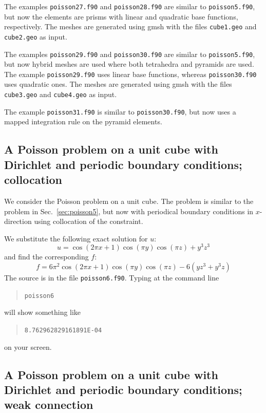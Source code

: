 The examples \texttt{poisson27.f90} and \texttt{poisson28.f90} are similar to \texttt{poisson5.f90}, but now the elements are prisms with linear and quadratic base functions, respectively. The meshes are generated using gmsh with the files \texttt{cube1.geo} and \texttt{cube2.geo} as input.

The examples \texttt{poisson29.f90} and \texttt{poisson30.f90} are similar to
\texttt{poisson5.f90}, but now hybrid meshes are used where both tetrahedra and
pyramids are used. The example  \texttt{poisson29.f90} uses linear base
functions, whereas  \texttt{poisson30.f90} uses quadratic ones. The meshes are generated using gmsh with the files \texttt{cube3.geo} and \texttt{cube4.geo} as input.

The example \texttt{poisson31.f90} is similar to \texttt{poisson30.f90}, but
now uses a mapped integration rule on the pyramid elements.

\subsection{A Poisson problem on a unit cube with Dirichlet
            and periodic boundary conditions; collocation}
\label{sec:poisson6}

We consider the Poisson problem on a unit cube. The problem is similar to
the problem in Sec.~\ref{sec:poisson5}, but now with periodical boundary
conditions in $x$-direction using collocation of the constraint.

We substitute the following exact solution for $u$:
\begin{equation}
     u=\cos(2\pi x+1)\cos(\pi y)\cos(\pi z) + y^3z^3
\end{equation}
and find the corresponding $f$:
\begin{equation}
     f=6\pi^2\cos(2\pi x+1)\cos(\pi y)\cos(\pi z) - 6(yz^3+y^3z)
\end{equation}
The source is in the file \texttt{poisson6.f90}.
Typing at the command line 
\begin{quote}
    \texttt{poisson6}
\end{quote}
will show something like
\begin{quote}
   \texttt{8.762962829161891E-04}
\end{quote}
on your screen.

\subsection{A Poisson problem on a unit cube with Dirichlet
            and periodic boundary conditions; weak connection}

